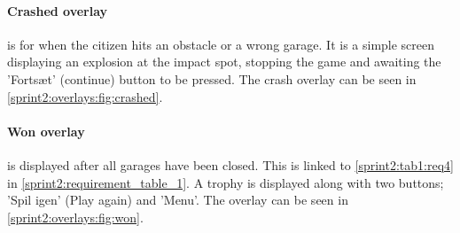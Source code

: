 \paragraph{Crashed overlay} is for when the citizen hits an obstacle or a wrong garage.
It is a simple screen displaying an explosion at the impact spot, stopping the game and awaiting the 'Fortsæt' (continue) button to be pressed.
The crash overlay can be seen in \cref{sprint2:overlays:fig:crashed}.

\paragraph{Won overlay}\label{sprint2:won} is displayed after all garages have been closed.
This is linked to \cref{sprint2:tab1:req4} in \cref{sprint2:requirement_table_1}.
A trophy is displayed along with two buttons; 'Spil igen' (Play again) and 'Menu'.
The overlay can be seen in \cref{sprint2:overlays:fig:won}.